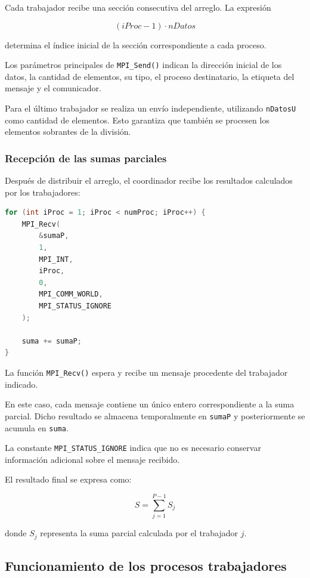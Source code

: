 \documentclass[12pt,a4paper]{article}
\begin{document}
Cada trabajador recibe una sección consecutiva del arreglo. La expresión

\[
(iProc-1)\cdot nDatos
\]

determina el índice inicial de la sección correspondiente a cada proceso.

Los parámetros principales de \texttt{MPI\_Send()} indican la dirección inicial de los datos, la cantidad de elementos, su tipo, el proceso destinatario, la etiqueta del mensaje y el comunicador.

Para el último trabajador se realiza un envío independiente, utilizando \texttt{nDatosU} como cantidad de elementos. Esto garantiza que también se procesen los elementos sobrantes de la división.

\subsubsection{Recepción de las sumas parciales}

Después de distribuir el arreglo, el coordinador recibe los resultados calculados por los trabajadores:

\begin{lstlisting}[language=C]
for (int iProc = 1; iProc < numProc; iProc++) {
    MPI_Recv(
        &sumaP,
        1,
        MPI_INT,
        iProc,
        0,
        MPI_COMM_WORLD,
        MPI_STATUS_IGNORE
    );

    suma += sumaP;
}
\end{lstlisting}

La función \texttt{MPI\_Recv()} espera y recibe un mensaje procedente del trabajador indicado.

En este caso, cada mensaje contiene un único entero correspondiente a la suma parcial. Dicho resultado se almacena temporalmente en \texttt{sumaP} y posteriormente se acumula en \texttt{suma}.

La constante \texttt{MPI\_STATUS\_IGNORE} indica que no es necesario conservar información adicional sobre el mensaje recibido.

El resultado final se expresa como:

\[
S = \sum_{j=1}^{P-1} S_j
\]

donde \(S_j\) representa la suma parcial calculada por el trabajador \(j\).

\subsection{Funcionamiento de los procesos trabajadores}
\end{document}
